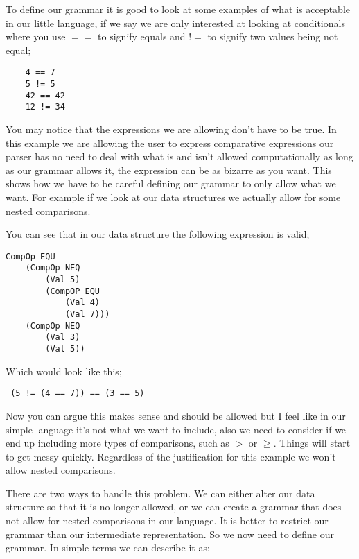 
To define our grammar it is good to look at some examples of what is acceptable in our little language, if we say we are only interested at looking at conditionals where you use $==$ to signify equals and $!=$ to signify two values being not equal;

\begin{lstlisting}
	4 == 7
	5 != 5
	42 == 42
	12 != 34 
\end{lstlisting}

You may notice that the expressions we are allowing don't have to be true. In this example we are allowing the user to express comparative expressions our parser has no need to deal with what is and isn't allowed computationally as long as our grammar allows it, the expression can be as bizarre as you want. This shows how we have to be careful defining our grammar to only allow what we want. For example if we look at our data structures we actually allow for some nested comparisons.

\newpage

You can see that in our data structure the following expression is valid;

\begin{lstlisting}
CompOp EQU 
	(CompOp NEQ 
		(Val 5) 
		(CompOP EQU 
			(Val 4)
			(Val 7))) 
	(CompOp NEQ 
		(Val 3) 
		(Val 5))
\end{lstlisting}

Which would look like this;

\begin{lstlisting}
 (5 != (4 == 7)) == (3 == 5)
\end{lstlisting}

Now you can argue this makes sense and should be allowed but I feel like in our simple language it's not what we want to include, also we need to consider if we end up including more types of comparisons, such as $>$ or $\geq$. Things will start to get messy quickly. Regardless of the justification for this example we won't allow nested comparisons. 

There are two ways to handle this problem. We can either alter our data structure so that it is no longer allowed, or we can create a grammar that does not allow for nested comparisons in our language. It is better to restrict our grammar than our intermediate representation. So we now need to define our grammar. In simple terms we can describe it as;

